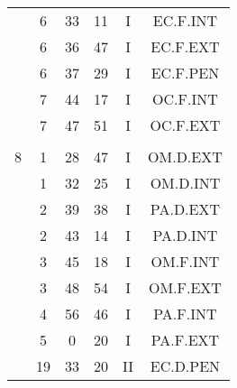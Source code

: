 \documentclass[12pt, a4paper]{article}
\begin{document}
\begin{multicols}{3}
{\begin{tabular}{c c c c c c}
	 	 	 	 & 6 & 33 & 11 & I & EC.F.INT\\%
	 	 	 	 & 6 & 36 & 47 & I & EC.F.EXT\\%
	 	 	 	 & 6 & 37 & 29 & I & EC.F.PEN\\%
	 	 	 	 & 7 & 44 & 17 & I & OC.F.INT\\%
	 	 	 	 & 7 & 47 & 51 & I & OC.F.EXT\\%
	 	 	 	 & & & & & \\%
	 	 	 	8 & 1 & 28 & 47 & I & OM.D.EXT\\%
	 	 	 	 & 1 & 32 & 25 & I & OM.D.INT\\%
	 	 	 	 & 2 & 39 & 38 & I & PA.D.EXT\\%
	 	 	 	 & 2 & 43 & 14 & I & PA.D.INT\\%
	 	 	 	 & 3 & 45 & 18 & I & OM.F.INT\\%
	 	 	 	 & 3 & 48 & 54 & I & OM.F.EXT\\%
	 	 	 	 & 4 & 56 & 46 & I & PA.F.INT\\%
	 	 	 	 & 5 & 0 & 20 & I & PA.F.EXT\\%
	 	 	 	 & 19 & 33 & 20 & II & EC.D.PEN\\%
	 	 \end{tabular}
 	}
\end{multicols}
\end{document}
